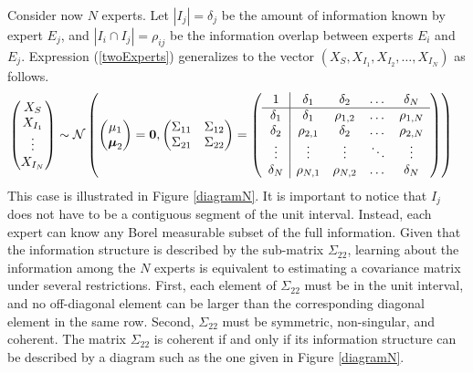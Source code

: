 \documentclass[11pt,twoside]{article}
\theoremstyle{definition}
\theoremstyle{definition}
\begin{document}
Consider now $N$ experts. Let $|I_j| = \delta_j$ be the amount of information known by expert $E_j$, and $|I_i \cap I_j| = \rho_{ij}$ be the information overlap between experts $E_i$ and $E_j$. Expression (\ref{twoExperts}) generalizes to the vector $(X_{S}, X_{I_1}, X_{I_2}, \dots, X_{I_N})$ as follows.
\begin{align}
\left(\begin{matrix} X_S \\ X_{I_1}\\ \vdots \\ X_{I_N} \end{matrix}\right) &\sim \mathcal{N}\left( \left(\begin{matrix} 
\mu_1 \\ \boldsymbol{\mu}_2
 \end{matrix}\right) =
 \boldsymbol{0}, \left(\begin{matrix} 
\Sigma_{11} & \Sigma_{12}\\
\Sigma_{21} & \Sigma_{22}\\
 \end{matrix}\right) 
 =
 \left(\begin{array}{c | c c cc }
1 & \delta_1 & \delta_2 & \dots & \delta_N  \\ \hline
\delta_1 & \delta_1 &\rho_{1,2} & \dots & \rho_{1,N}   \\ 
\delta_2 & \rho_{2,1} & \delta_2 & \dots & \rho_{2,N}  \\ 
\vdots & \vdots & \vdots & \ddots & \vdots  \\ 
\delta_N & \rho_{N,1} & \rho_{N,2} & \dots & \delta_N\\ 
 \end{array}\right)\right)  \label{NExperts}
\end{align}
This case is illustrated in Figure \ref{diagramN}. It is important to notice that $I_j$ does not have to be a contiguous segment of the unit interval. Instead, each expert can know any Borel measurable subset of the full information. Given that the information structure is described by the sub-matrix $\Sigma_{22}$, learning about the information among the $N$ experts is equivalent to estimating a covariance matrix under several restrictions. First, each element of $\Sigma_{22}$ must be in the unit interval, and no off-diagonal element can be larger than the corresponding diagonal element in the same row. Second, $\Sigma_{22}$ must be symmetric, non-singular, and coherent. The matrix $\Sigma_{22}$ is coherent if and only if its information structure can be described by a diagram such as the one given in Figure \ref{diagramN}. 
\end{document}
